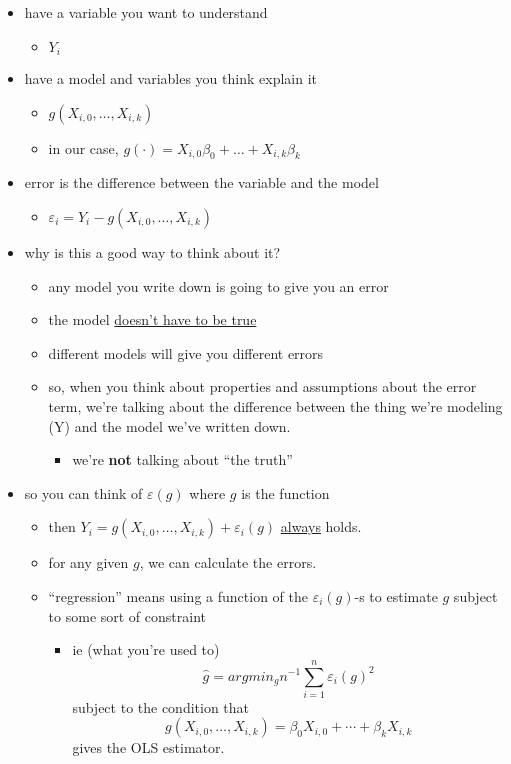 \begin{itemize}
\item have a variable you want to understand
\begin{itemize}
\item $Y_i$
\end{itemize}
\item have a model and variables you think explain it
\begin{itemize}
\item $g(X_{i,0},\dots,X_{i,k})$
\item in our case, $g(\cdot) = X_{i,0}\beta_0 + \dots + X_{i,k}\beta_k$
\end{itemize}
\item error is the difference between the variable and the model
\begin{itemize}
\item $\varepsilon_i = Y_i - g(X_{i,0},\dots,X_{i,k})$
\end{itemize}
\item why is this a good way to think about it?
\begin{itemize}
\item any model you write down is going to give you an error
\item the model \underline{doesn't have to be true}
\item different models will give you different errors
\item so, when you think about properties and assumptions about the
          error term, we're talking about the difference between the
          thing we're modeling (Y) and the model we've written down.
\begin{itemize}
\item we're \textbf{not} talking about ``the truth''
\end{itemize}
\end{itemize}
\item so you can think of $\varepsilon(g)$ where $g$ is the function
\begin{itemize}
\item then $Y_i = g(X_{i,0},\dots,X_{i,k}) + \varepsilon_i(g)$
          \underline{always} holds.
\item for any given $g$, we can calculate the errors.
\item ``regression'' means using a function of the $\varepsilon_i(g)$-s
          to estimate $g$ subject to some sort of constraint
\begin{itemize}
\item ie (what you're used to)
            \[\hat g = argmin_g n^{-1} \sum_{i=1}^n \varepsilon_i(g)^2\]
            subject to the condition that
            \[g(X_{i,0}, \dots, X_{i,k}) = \beta_0 X_{i,0}+ \cdots +
            \beta_k X_{i,k}\]
            gives the OLS estimator.
\end{itemize}
\end{itemize}
\end{itemize}
